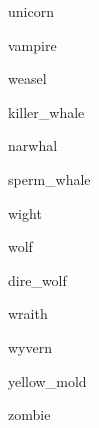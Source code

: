 \documentclass[letterpaper,serif]{module}
\begin{document}
\begin{newmonster}{unicorn}\end{newmonster}

\begin{newmonster}{vampire}\end{newmonster}

\begin{newmonster}{weasel}\end{newmonster}

\begin{newmonster}{killer_whale}\end{newmonster}

\begin{newmonster}{narwhal}\end{newmonster}

\begin{newmonster}{sperm_whale}\end{newmonster}

\begin{newmonster}{wight}\end{newmonster}

\begin{newmonster}{wolf}\end{newmonster}

\begin{newmonster}{dire_wolf}\end{newmonster}

\begin{newmonster}{wraith}\end{newmonster}

\begin{newmonster}{wyvern}\end{newmonster}

\begin{newmonster}{yellow_mold}\end{newmonster}

\begin{newmonster}{zombie}\end{newmonster}

\onecolumn
\end{document}
